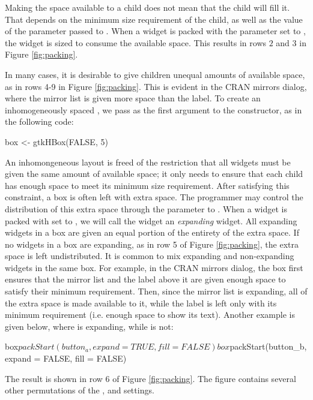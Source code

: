 \documentclass[article,shortnames]{jss}
\begin{document}
Making the space available to a child does not mean that the
child will fill it. That depends on the minimum size requirement of
the child, as well as the value of the  parameter passed to
. When a widget is packed with the 
parameter set to , the widget is sized to consume the
available space. This results in rows $2$ and $3$ in Figure
\ref{fig:packing}.


In many cases, it is desirable to give children unequal amounts of
available space, as in rows 4-9 in Figure \ref{fig:packing}. This is
evident in the CRAN mirrors dialog, where the mirror list is given
more space than the  label. To create an
inhomogeneously spaced , we pass
 as the first argument to the constructor, as in the
following code:
\begin{Code}
box <- gtkHBox(FALSE, 5)
\end{Code}

An inhomongeneous layout is freed of the restriction that all widgets
must be given the same amount of available space; it only needs to
ensure that each child has enough space to meet its minimum size
requirement. After satisfying this constraint, a box is often left
with extra space. The programmer may control the distribution of this
extra space through the  parameter to
.  When a widget is packed with 
set to , we will call the widget an \emph{expanding}
widget. All expanding widgets in a box are given an equal portion of
the entirety of the extra space. If no widgets in a box are expanding,
as in row 5 of Figure \ref{fig:packing}, the extra space is left
undistributed. It is common to mix expanding and non-expanding widgets
in the same box. For example, in the CRAN mirrors dialog, the box
first ensures that the mirror list and the label above it are given
enough space to satisfy their minimum requirement. Then, since the
mirror list is expanding, all of the extra space is made available to
it, while the label is left only with its minimum requirement (i.e.
enough space to show its text).
Another example is given below, where  is expanding,
while  is not:
\begin{Code}
box$packStart(button_a, expand = TRUE, fill = FALSE)
box$packStart(button_b, expand = FALSE, fill = FALSE)
\end{Code}
The result is shown in row 6 of Figure \ref{fig:packing}. 
The figure contains several other permutations of the
,  and  settings.
\end{document}
